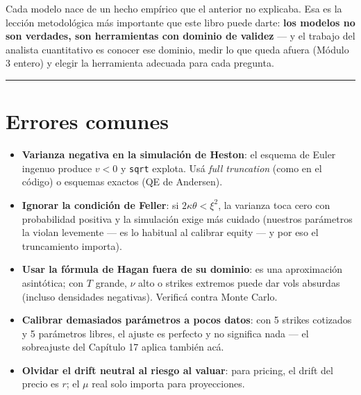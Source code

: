 \documentclass[
  spanish,
  letterpaper,
  DIV=11,
  numbers=noendperiod]{scrreprt}
\providecommand{\tightlist}{%
  \setlength{\itemsep}{0pt}\setlength{\parskip}{0pt}}
\begin{document}
Cada modelo nace de un hecho empírico que el anterior no explicaba. Esa
es la lección metodológica más importante que este libro puede darte:
\textbf{los modelos no son verdades, son herramientas con dominio de
validez} --- y el trabajo del analista cuantitativo es conocer ese
dominio, medir lo que queda afuera (Módulo 3 entero) y elegir la
herramienta adecuada para cada pregunta.

\begin{center}\rule{0.5\linewidth}{0.5pt}\end{center}

\chapter{Errores comunes}\label{errores-comunes-18}

\begin{tcolorbox}[enhanced jigsaw, bottomrule=.15mm, colback=white, opacitybacktitle=0.6, arc=.35mm, toprule=.15mm, opacityback=0, breakable, titlerule=0mm, left=2mm, coltitle=black, colbacktitle=quarto-callout-warning-color!10!white, colframe=quarto-callout-warning-color-frame, leftrule=.75mm, toptitle=1mm, bottomtitle=1mm, title=\textcolor{quarto-callout-warning-color}{\faExclamationTriangle}\hspace{0.5em}{Trampas frecuentes}, rightrule=.15mm]

\begin{itemize}
\tightlist
\item
  \textbf{Varianza negativa en la simulación de Heston}: el esquema de
  Euler ingenuo produce \(v < 0\) y \texttt{sqrt} explota. Usá
  \emph{full truncation} (como en el código) o esquemas exactos (QE de
  Andersen).
\item
  \textbf{Ignorar la condición de Feller}: si \(2\kappa\theta < \xi^2\),
  la varianza toca cero con probabilidad positiva y la simulación exige
  más cuidado (nuestros parámetros la violan levemente --- es lo
  habitual al calibrar equity --- y por eso el truncamiento importa).
\item
  \textbf{Usar la fórmula de Hagan fuera de su dominio}: es una
  aproximación asintótica; con \(T\) grande, \(\nu\) alto o strikes
  extremos puede dar vols absurdas (incluso densidades negativas).
  Verificá contra Monte Carlo.
\item
  \textbf{Calibrar demasiados parámetros a pocos datos}: con 5 strikes
  cotizados y 5 parámetros libres, el ajuste es perfecto y no significa
  nada --- el sobreajuste del Capítulo 17 aplica también acá.
\item
  \textbf{Olvidar el drift neutral al riesgo al valuar}: para pricing,
  el drift del precio es \(r\); el \(\mu\) real solo importa para
  proyecciones.
\end{itemize}

\end{tcolorbox}
\end{document}
